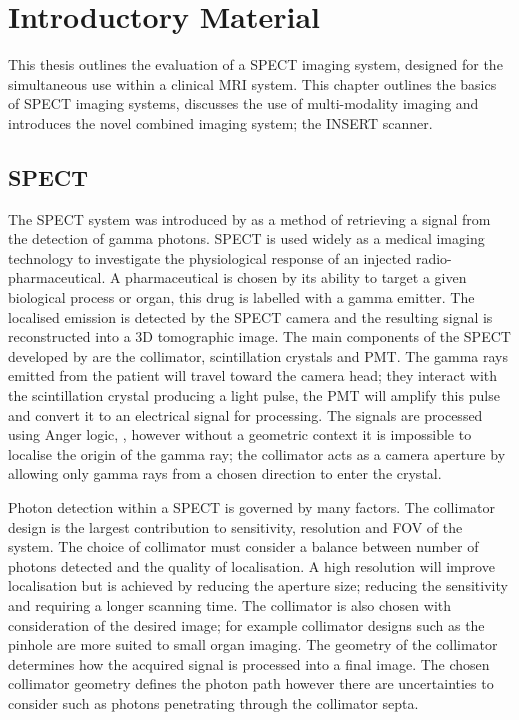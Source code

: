 \chapter{Introductory Material}
\label{Introduction}

This thesis outlines the evaluation of a \acrshort{SPECT} imaging system, designed for the simultaneous use within a clinical \acrshort{MRI} system. This chapter outlines the basics of \acrshort{SPECT} imaging systems, discusses the use of multi-modality imaging and introduces the novel combined imaging system; the \acrshort{INSERT} scanner. 

\section{SPECT}
The \acrlong{SPECT} system was introduced by \cite{Anger} as a method of retrieving a signal from the detection of gamma photons. \acrshort{SPECT} is used widely as a medical imaging technology to investigate the physiological response of an injected radio-pharmaceutical. A pharmaceutical is chosen by its ability to target a given biological process or organ, this drug is labelled with a gamma emitter. The localised emission is detected by the \acrshort{SPECT} camera and the resulting signal is reconstructed into a 3D tomographic image. The main components of the \acrshort{SPECT} developed by \cite{Anger and Rosenthal} are the collimator, scintillation crystals and \acrlong{PMT}. The gamma rays emitted from the patient will travel toward the camera head; they interact with the scintillation crystal producing a light pulse, the \acrshort{PMT} will amplify this pulse and convert it to an electrical signal for processing. The signals are processed using Anger logic, \cite{angerLogic}, however without a geometric context it is impossible to localise the origin of the gamma ray; the collimator acts as a camera aperture by allowing only gamma rays from a chosen direction to enter the crystal.

Photon detection within a \acrshort{SPECT} is governed by many factors. The collimator design is the largest contribution to sensitivity, resolution and \acrlong{FOV} of the system. The choice of collimator must consider a balance between number of photons detected and the quality of localisation. A high resolution will improve localisation but is achieved by reducing the aperture size; reducing the sensitivity and requiring a longer scanning time. The collimator is also chosen with consideration of the desired image; for example collimator designs such as the pinhole are more suited to small organ imaging. The geometry of the collimator determines how the acquired signal is processed into a final image. The chosen collimator geometry defines the photon path however there are uncertainties to consider such as photons penetrating through the collimator septa. 

